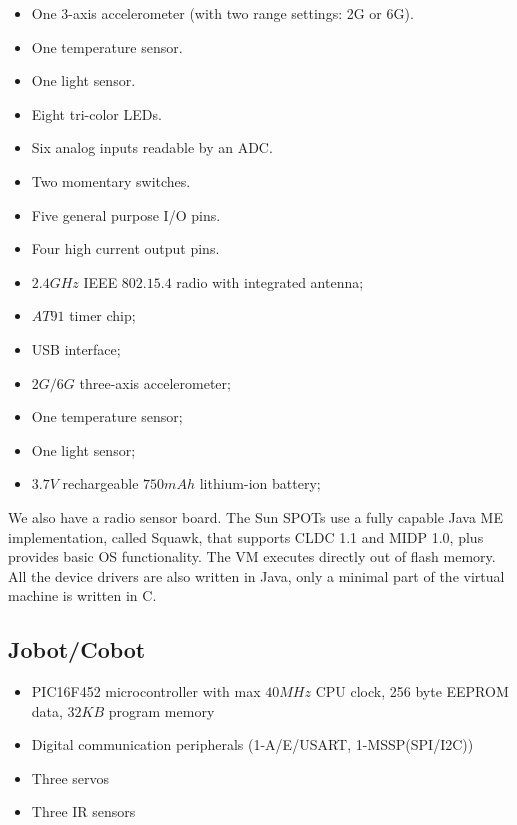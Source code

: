\documentclass[a4paper,10pt]{article} %
\begin{document}
\begin{itemize}
    \item One 3-axis accelerometer (with two range settings: 2G or 6G).
    \item One temperature sensor.
    \item One light sensor.
    \item Eight tri-color LEDs.
    \item Six analog inputs readable by an ADC.
    \item Two momentary switches.
    \item Five general purpose I/O pins.
    \item Four high current output pins.
    \item $2.4 GHz$ IEEE $802.15.4$ radio with integrated antenna;
    \item $AT91$ timer chip;
    \item USB interface;
    \item $2G/6G$ three-axis accelerometer;
    \item One temperature sensor;
    \item One light sensor;
    \item $3.7V$ rechargeable $750 mAh$ lithium-ion battery;
\end{itemize}

We also have a radio sensor board. The Sun SPOTs use a fully capable Java ME
implementation, called Squawk, that supports CLDC 1.1 and MIDP 1.0, plus
provides basic OS functionality. The VM executes directly out of flash memory.
All the device drivers are also written in Java, only a minimal part of the
virtual machine is written in C.


\subsection{Jobot/Cobot} %
\label{app:cobot}

\begin{itemize}
    \item PIC16F452 microcontroller with max $40MHz$ CPU clock, 256 byte
    EEPROM data, $32KB$ program memory
    \item Digital communication peripherals (1-A/E/USART, 1-MSSP(SPI/I2C))
    \item Three servos
    \item Three IR sensors
\end{itemize}

\end{document}
